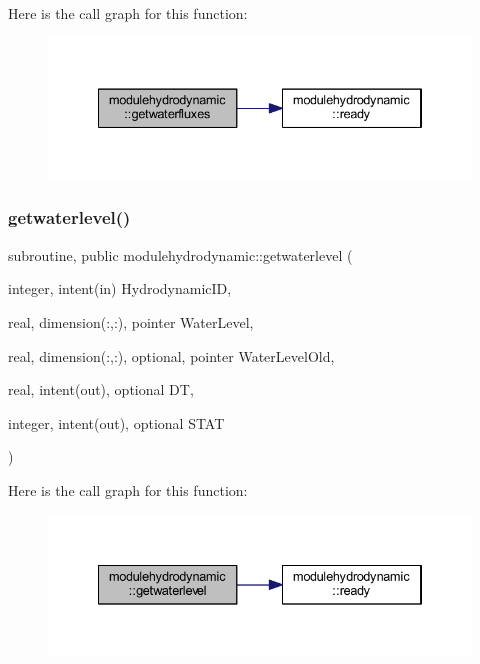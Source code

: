 Here is the call graph for this function\+:\nopagebreak
\begin{figure}[H]
\begin{center}
\leavevmode
\includegraphics[width=334pt]{namespacemodulehydrodynamic_a29f89183d9394468a6db08ec640599f1_cgraph}
\end{center}
\end{figure}
\mbox{\label{namespacemodulehydrodynamic_ad29ca3143969ea453d432e0a8f2dde2d}} 
\subsubsection{\texorpdfstring{getwaterlevel()}{getwaterlevel()}}
{\footnotesize\ttfamily subroutine, public modulehydrodynamic\+::getwaterlevel (\begin{DoxyParamCaption}\item[{integer, intent(in)}]{Hydrodynamic\+ID,  }\item[{real, dimension(\+:,\+:), pointer}]{Water\+Level,  }\item[{real, dimension(\+:,\+:), optional, pointer}]{Water\+Level\+Old,  }\item[{real, intent(out), optional}]{DT,  }\item[{integer, intent(out), optional}]{S\+T\+AT }\end{DoxyParamCaption})}

Here is the call graph for this function\+:\nopagebreak
\begin{figure}[H]
\begin{center}
\leavevmode
\includegraphics[width=334pt]{namespacemodulehydrodynamic_ad29ca3143969ea453d432e0a8f2dde2d_cgraph}
\end{center}
\end{figure}
\mbox{\label{namespacemodulehydrodynamic_a904ffc2601f0d353ef41686c0912a17d}} 
